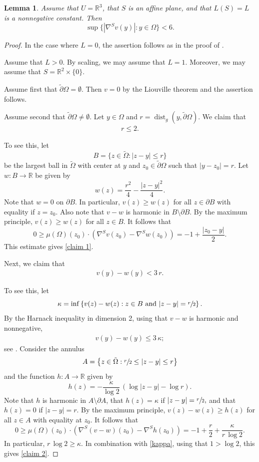 \documentclass[11pt]{amsart}
\newtheorem{lem}[prop]{Lemma}
\begin{document}
\begin{lem} \label{gradient bound}
	Assume that $U=\mathbb{R}^3$,  that $S$ is an affine plane, and that $L(S)=L$ is a nonnegative constant. Then
	$$
	\sup\{|\nabla^S v(y)|:y\in \Omega\}<6.
	$$
\end{lem}
\begin{proof}
	In the case where $L=0$, the assertion follows as in the proof of \cite[Proposition A.2]{KamburovWang}.
	
	Assume that  $L>0$. 	By scaling, we may assume that $L=1$. Moreover, we may assume that $S=\mathbb{R}^2\times\{0\}$.  
	
	Assume first that $\tilde \partial \Omega=\emptyset$. Then $v=0$ by the Liouville theorem and the assertion  follows.
	
 Assume second that $\tilde \partial \Omega\neq \emptyset$.	Let $y\in \Omega$ and $r=\operatorname{dist}_g(y,\tilde\partial \Omega)$. We claim that 
	\begin{align} \label{claim 1}
	r\leq 2.
	\end{align}
	
	 To see this, let 
	$$
	B=\{z\in \tilde \Omega:|z-y|\leq r\}
	$$
	be the largest ball in $\tilde \Omega$ with center at $y$ and
	 $z_0\in \tilde \partial \Omega$  such that $|y-z_0|=r$. Let
 $w: B\to \mathbb{R}$ be  given by $$w(z)=\frac{r^2}4-\frac{|z-y|^2}{4}.$$ Note that $w=0$ on $\partial B$. In particular, $v(z)\geq w(z)$ for all $z\in \partial B$ with equality if $z=z_0$. Also note that $v-w$ is harmonic in $B\setminus \partial B$. By the maximum principle, $v(z)\geq w(z)$ for all $z\in B$.  It follows that 
	$$
	0\geq \mu(\Omega)(z_0)\cdot (\nabla^{S}v(z_0)-\nabla^{S}w(z_0))=-1+\frac{|z_0-y|}{2}.
	$$
	This estimate gives \eqref{claim 1}.
	
	Next, we claim that  
	\begin{align} \label{claim 2}
	v(y)-w(y)< 3\,r.
	\end{align} 
	
	To see this, let $$\kappa=\inf\left\{v(z)-w(z):z\in B\text{ and }|z-y|=\sfrac{r}2\right\}.$$
	By the Harnack inequality in dimension 2, using that $v-w$ is harmonic and nonnegative,  
	\begin{align} \label{kappa} v(y)-w(y)\leq 3\,\kappa;
		\end{align}
		see \cite[(1)]{SerrinHarnack}.  Consider the annulus $$A=\left\{z\in \tilde \Omega:\sfrac{r}2\leq |z-y|\leq  r\right \}$$ and the function $h:A\to \mathbb{R}$  given by
	$$
	h(z)=-\frac{\kappa}{\log 2}\,\left(\log|z-y|-\log r\right).
	$$
	Note that  $h$ is harmonic in $A\setminus \partial A$, that  $h(z)=\kappa$ if $|z-y|=\sfrac{r}2,$ and that $h(z)=0$ if $|z-y|=r$. By the maximum principle,  $v(z)-w(z) \geq h(z)$ for all $z\in A$ with equality at $z_0$. It follows that
	$$
	0\geq  \mu(\Omega)(z_0)\cdot \left(\nabla^S(v-w)(z_0) -\nabla^Sh(z_0)\right)=-1+\frac{r}{2}+\frac{\kappa}{r\,\log2}.
	$$
	In particular, $r\, \log2\geq \kappa$. In combination with \eqref{kappa}, using that $1> \log 2$, this gives  \eqref{claim 2}.
	

\end{proof}
\end{document}
